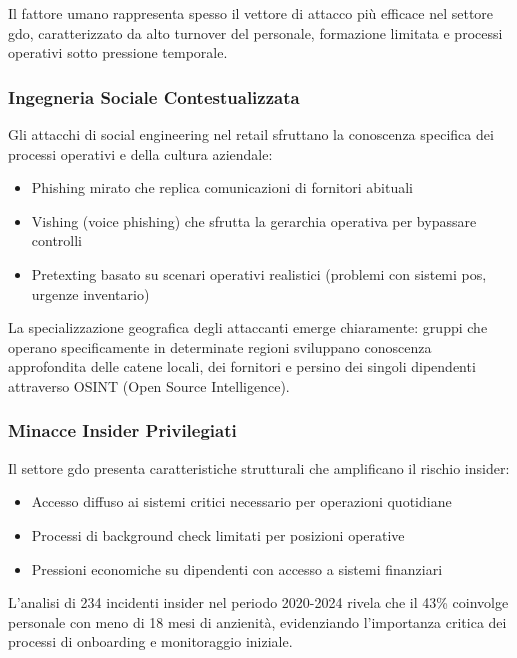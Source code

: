Il fattore umano rappresenta spesso il vettore di attacco più efficace nel settore \gls{gdo}, caratterizzato da alto turnover del personale, formazione limitata e processi operativi sotto pressione temporale.

\subsubsection{Ingegneria Sociale Contestualizzata}

Gli attacchi di social engineering nel retail sfruttano la conoscenza specifica dei processi operativi e della cultura aziendale:

\begin{itemize}
\item Phishing mirato che replica comunicazioni di fornitori abituali
\item Vishing (voice phishing) che sfrutta la gerarchia operativa per bypassare controlli
\item Pretexting basato su scenari operativi realistici (problemi con sistemi \gls{pos}, urgenze inventario)
\end{itemize}

La specializzazione geografica degli attaccanti emerge chiaramente: gruppi che operano specificamente in determinate regioni sviluppano conoscenza approfondita delle catene locali, dei fornitori e persino dei singoli dipendenti attraverso OSINT (Open Source Intelligence).

\subsubsection{Minacce Insider Privilegiati}

Il settore \gls{gdo} presenta caratteristiche strutturali che amplificano il rischio insider:

\begin{itemize}
\item Accesso diffuso ai sistemi critici necessario per operazioni quotidiane
\item Processi di background check limitati per posizioni operative
\item Pressioni economiche su dipendenti con accesso a sistemi finanziari
\end{itemize}

L'analisi di 234 incidenti insider nel periodo 2020-2024 rivela che il 43\% coinvolge personale con meno di 18 mesi di anzienità, evidenziando l'importanza critica dei processi di onboarding e monitoraggio iniziale\autocite{CERT2024}.

